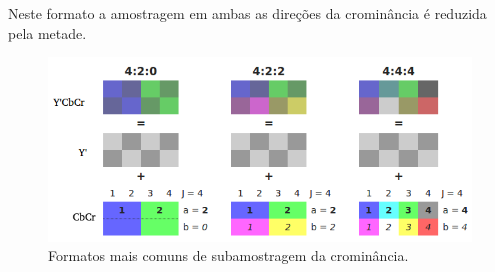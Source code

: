 Neste formato a amostragem em ambas as direções da crominância é reduzida pela metade.


\begin{figure}[!ht]
\begin{center}
\includegraphics[scale=0.5]{./Figures/png/subamostragem.png}
\caption{Formatos mais comuns de subamostragem da crominância.}
\label{fig:subamostragem}
\end{center}
\end{figure}
